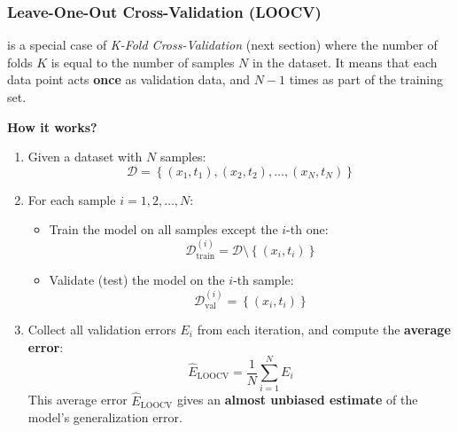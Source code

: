 \subsubsection{Leave-One-Out Cross-Validation (LOOCV)}

 is a special case of \emph{K-Fold Cross-Validation} (next section) where the number of folds $K$ is equal to the number of samples $N$ in the dataset. It means that each data point acts \textbf{once} as validation data, and $N-1$ times as part of the training set.

\highspace
\begin{flushleft}
    \textcolor{Green3}{ \textbf{How it works?}}
\end{flushleft}
\begin{enumerate}
    \item Given a dataset with $N$ samples:
    \begin{equation*}
        \mathcal{D} = \left\{
            \left(x_1, t_1\right),
            \left(x_2, t_2\right),
            \ldots,
            \left(x_N, t_N\right)
        \right\}
    \end{equation*}
    \item For each sample $i = 1, 2, \ldots, N$:
    \begin{itemize}
        \item Train the model on all samples except the $i$-th one:
        \begin{equation*}
            \mathcal{D}_{\text{train}}^{(i)} = \mathcal{D} \setminus \left\{ \left(x_i, t_i\right) \right\}
        \end{equation*}
        \item Validate (test) the model on the $i$-th sample:
        \begin{equation*}
            \mathcal{D}_{\text{val}}^{(i)} = \left\{ \left(x_i, t_i\right) \right\}
        \end{equation*}
    \end{itemize}
    \item Collect all validation errors $E_{i}$ from each iteration, and compute the \textbf{average error}:
    \begin{equation*}
        \hat{E}_{\text{LOOCV}} = \dfrac{1}{N} \sum_{i=1}^{N} E_{i}
    \end{equation*}
    This average error $\hat{E}_{\text{LOOCV}}$ gives an \textbf{almost unbiased estimate} of the model's generalization error.
\end{enumerate}

